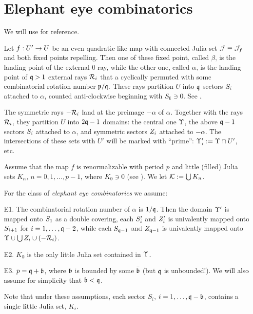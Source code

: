 
\section{Elephant eye combinatorics}

We will use \cite{Book} for reference.


Let $f: U' \rightarrow U$ be an even  quadratic-like map with connected Julia set
${\mathcal{J}}\equiv {\mathcal{J}}_f$ 
and both fixed points repelling.
Then one of these fixed point, called $\beta$, is the landing point of
the external $0$-ray,
while the other one, called $\alpha$, is the landing point of ${\mathfrak{q}}>1$
external rays ${\mathcal R}_i$ that a cyclically permuted with
some combinatorial rotation number ${\mathfrak{p}}/{\mathfrak{q}}$.
These rays partition $U$ into ${\mathfrak{q}}$ sectors ${{S}}_i$ attached to $\alpha$,
counted anti-clockwise beginning with $S_0\ni 0$. 
See  \cite[\S 24.4]{Book}.


The symmetric rays $-{\mathcal R}_i$ land at the preimage $-\alpha$ of
$\alpha$.  Together with the rays ${\mathcal R}_i$, they partition $U$ into $2{\mathfrak{q}}-1$ domains: the
central one ${\Upsilon}$, the above ${\mathfrak{q}}-1$ sectors ${{S}}_i$ attached to $\alpha$,
and symmetric sectors ${{Z}}_i$ attached to $-\alpha$.   
The intersections of these sets with $U'$ will be marked with
``prime'': ${\Upsilon}_i':= {\Upsilon}\cap U'$, etc.   

Assume that the map $f$ is renormalizable with period $p$ and little
(filled) Julia sets $K_n$, $n=0,1,\dots, p-1$, where $K_0\ni 0$
(see \cite[\S 28.4]{Book}).  We let ${\mathcal {K} }:= \bigcup K_n$.  

\msk
For the class of {\em elephant eye combinatorics} we assume:

\ssk\nin E1. The combinatorial rotation number of $\alpha$ is $1/{\mathfrak{q}}$.
  Then the domain ${\Upsilon}'$ is mapped onto ${{S}}_1$ as a double covering,
  each ${{S}}_i'$ and ${{Z}}_i'$ is univalently  mapped onto
  ${{S}}_{i+1}$ for $i=1,\dots, {\mathfrak{q}}-2$, while each ${{S}}_{{\mathfrak{q}}-1}$ and ${{Z}}_{{\mathfrak{q}}-1}$ is
  univalently mapped onto ${\Upsilon} \cup \bigcup {{Z}}_i\cup (-{\mathcal R}_i)$.

  
  \ssk\nin E2.
  $K_0$ is the only little Julia set contained in ${\Upsilon}$.

  \ssk\nin E3. $p= {\mathfrak{q}}+ {\mathfrak{b}}$, where ${\mathfrak{b}}$ is bounded by some $\bar {{\mathfrak{b}}}$
  (but ${\mathfrak{q}}$ is unbounded!).   We will also assume for simplicity that
    ${\mathfrak{b}}< {\mathfrak{q}}$. 

    \ssk Note that under these assumptions,
     each sector $S_i$, $i=1,\dots, {\mathfrak{q}}-{\mathfrak{b}}$,
    contains a single little Julia set, $K_i$.
    
